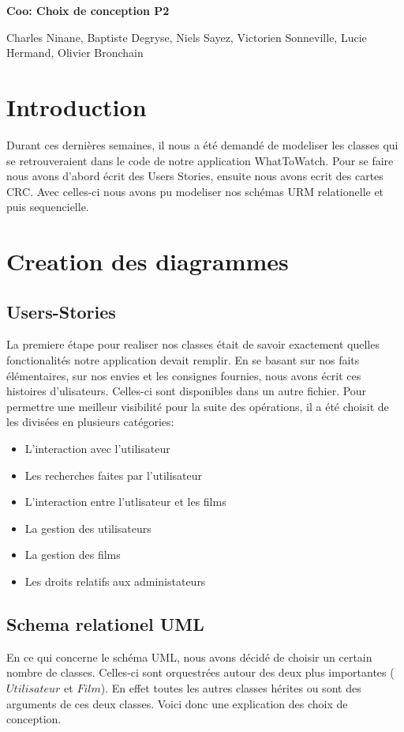 \documentclass[10pt,a4paper]{article}
\begin{document}
\begin{center}
\Huge{\textbf{Coo: Choix de conception P2}}

\large{Charles Ninane, Baptiste Degryse, Niels Sayez, Victorien Sonneville, Lucie Hermand, Olivier Bronchain}

\end{center}

\section{Introduction}
	Durant ces dernières semaines, il nous a été demandé de modeliser les classes qui se retrouveraient dans le code de notre application WhatToWatch. Pour se faire nous avons d'abord écrit des Users Stories, ensuite nous avons ecrit des cartes CRC. Avec celles-ci nous avons pu modeliser nos schémas URM relationelle et puis sequencielle.
\section{Creation des diagrammes}
\subsection{Users-Stories}
	La premiere étape pour realiser nos classes était de savoir exactement quelles fonctionalités notre application devait remplir. En se basant sur nos faits élémentaires, sur nos envies et les consignes fournies, nous avons écrit ces histoires d'ulisateurs. Celles-ci sont disponibles dans un autre fichier. Pour permettre une meilleur visibilité pour la suite des opérations, il a été choisit de les divisées en plusieurs catégories:
	\begin{itemize}
		\item L'interaction avec l'utilisateur
		\item Les recherches faites par l'utilisateur
		\item L'interaction entre l'utlisateur et les films
		\item La gestion des utilisateurs
		\item La gestion des films
		\item Les droits relatifs aux administateurs
	\end{itemize}
\subsection{Schema relationel UML}
	En ce qui concerne le schéma UML, nous avons décidé de choisir un certain nombre de classes. Celles-ci sont orquestrées autour des deux plus importantes ($Utilisateur$ et $Film$). En effet toutes les autres classes hérites ou sont des arguments de ces deux classes. Voici donc une explication des choix de conception.
	
\end{document}
